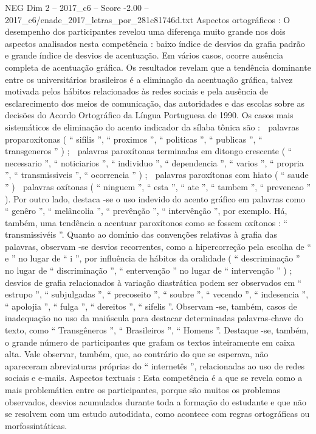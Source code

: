 \begin{textsample}{NEG Dim 2 – 2017\_c6 – Score -2.00 – 2017\_c6/enade\_2017\_letras\_por\_281c81746d.txt}
Aspectos ortográficos : O desempenho dos participantes revelou uma diferença muito grande nos dois aspectos analisados nesta competência : baixo índice de desvios da grafia padrão e grande índice de desvios de acentuação.
Em vários casos, ocorre ausência completa de acentuação gráfica.
Os resultados revelam que a tendência dominante entre os universitários brasileiros é a eliminação da acentuação gráfica, talvez motivada pelos hábitos relacionados às redes sociais e pela ausência de esclarecimento dos meios de comunicação, das autoridades e das escolas sobre as decisões do Acordo Ortográfico da Língua Portuguesa de 1990.
Os casos mais sistemáticos de eliminação do acento indicador da sílaba tônica são :  palavras proparoxítonas ( “ sifilis ”, “ proximos ”, “ politicas ”, “ publicas ”, “ transgeneros ” ) ;  palavras paroxítonas terminadas em ditongo crescente ( “ necessario ”, “ noticiarios ”, “ individuo ”, “ dependencia ”, “ varios ”, “ propria ”, “ transmissiveis ”, “ ocorrencia ” ) ;  palavras paroxítonas com hiato ( “ saude ” )  palavras oxítonas ( “ ninguem ”, “ esta ”, “ ate ”, “ tambem ”, “ prevencao ” ).
Por outro lado, destaca -se o uso indevido do acento gráfico em palavras como “ genêro ”, “ melâncolia ”, “ prevênção ”, “ intervênção ”, por exemplo.
Há, também, uma tendência a acentuar paroxítonos como se fossem oxítonos : “ transmissivéis ”.
Quanto ao domínio das convenções relativas à grafia das palavras, observam -se desvios recorrentes, como a hipercorreção pela escolha de “ e ” no lugar de “ i ”, por influência de hábitos da oralidade ( “ descriminação ” no lugar de “ discriminação ”, “ entervenção ” no lugar de “ intervenção ” ) ; desvios de grafia relacionados à variação diastrática podem ser observados em “ estrupo ”, “ subjulgadas ”, “ precoseito ”, “ soubre ”, “ vecendo ”, “ indesencia ”, “ apolojia ”, “ fulga ”, “ dereitos ”, “ sifelis ”.
Observam -se, também, casos de inadequação no uso da maiúscula para destacar determinadas palavras-chave do texto, como “ Transgêneros ”, “ Brasileiros ”, “ Homens ”.
Destaque -se, também, o grande número de participantes que grafam os textos inteiramente em caixa alta.
Vale observar, também, que, ao contrário do que se esperava, não apareceram abreviaturas próprias do “ internetês ”, relacionadas ao uso de redes sociais e e-mails.
Aspectos textuais : Esta competência é a que se revela como a mais problemática entre os participantes, porque são muitos os problemas observados, desvios acumulados durante toda a formação do estudante e que não se resolvem com um estudo autodidata, como acontece com regras ortográficas ou morfossintáticas.

\end{textsample}

